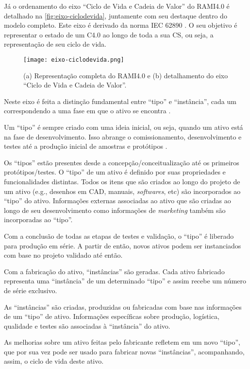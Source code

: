 Já o ordenamento do eixo ``Ciclo de Vida e Cadeia de Valor'' do RAMI4.0 é detalhado na \autoref{fig:eixo-ciclodevida}, juntamente com seu destaque dentro do modelo completo. Este eixo é derivado da norma IEC 62890 \cite{adolphs2015rami}. O seu objetivo é representar o estado de um C4.0 ao longo de toda a sua CS, ou seja, a representação de seu ciclo de vida.

\begin{figure}[htb]
	\centering
	\texttt{[image: eixo-ciclodevida.png]}
	\caption{(a) Representação completa do RAMI4.0 e (b) detalhamento do eixo ``Ciclo de Vida e Cadeia de Valor''.}
	\label{fig:eixo-ciclodevida}
\end{figure}

Neste eixo é feita a distinção fundamental entre ``tipo'' e ``instância'', cada um correspondendo a uma fase em que o ativo se encontra \cite{adolphs2015rami}.

Um ``tipo'' é sempre criado com uma ideia inicial, ou seja, quando um ativo está na fase de desenvolvimento. Isso abrange o comissionamento, desenvolvimento e testes até a produção inicial de amostras e protótipos \cite{adolph2018roadmap}.

Os ``tipos'' estão presentes desde a concepção/conceitualização até os primeiros protótipos/testes. O ``tipo'' de um ativo é definido por suas propriedades e funcionalidades distintas. Todos os itens que são criados ao longo do projeto de um ativo (e.g., desenhos em CAD, manuais, \textit{softwares}, etc) são incorporados ao ``tipo'' do ativo. Informações externas associadas ao ativo que são criadas ao longo de seu desenvolvimento como informações de \textit{marketing} também são incorporadas ao ``tipo''.

Com a conclusão de todas as etapas de testes e validação, o ``tipo'' é liberado para produção em série. A partir de então, novos ativos podem ser instanciados com base no projeto validado até então.

Com a fabricação do ativo, ``instâncias'' são geradas. Cada ativo fabricado representa uma ``instância'' de um determinado ``tipo'' e assim recebe um número de série exclusivo.

As ``instâncias'' são criadas, produzidas ou fabricadas com base nas informações de um ``tipo'' de ativo. Informações específicas sobre produção, logística, qualidade e testes são associadas à ``instância'' do ativo.

As melhorias sobre um ativo feitas pelo fabricante refletem em um novo ``tipo'', que por sua vez pode ser usado para fabricar novas ``instâncias'', acompanhando, assim, o ciclo de vida deste ativo.

